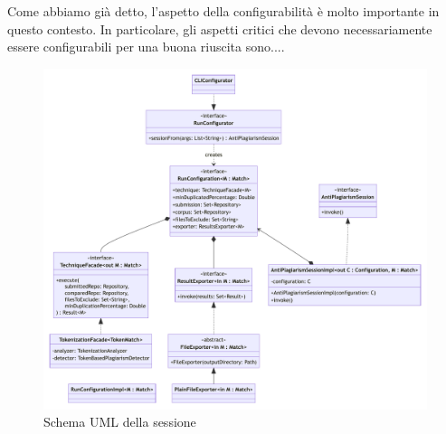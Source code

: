 Come abbiamo già detto, l'aspetto della configurabilità è molto importante in questo contesto.
%
In particolare, gli aspetti critici che devono necessariamente essere configurabili per una buona riuscita sono....


\begin{figure}
    \centering
    \includegraphics[width=0.9\textheight]{resources/img/02-session.pdf}
    \caption{Schema UML della sessione}
    \label{img:02-session}
\end{figure}

